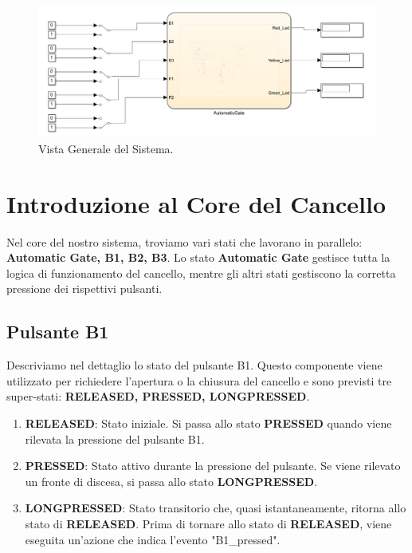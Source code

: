 \documentclass[12pt]{article}
\begin{document}
\begin{figure}[H]
    \centering
    \includegraphics[width=1\textwidth]{Immagini_State_Flow/Vista_Generale.jpg}
    \caption{Vista Generale del Sistema.}
\end{figure}

\section{Introduzione al Core del Cancello}

Nel core del nostro sistema, troviamo vari stati che lavorano in parallelo: \textbf{Automatic Gate, B1, B2, B3}. Lo stato \textbf{Automatic Gate} gestisce tutta la logica di funzionamento del cancello, mentre gli altri stati gestiscono la corretta pressione dei rispettivi pulsanti.

\subsection{Pulsante B1}

Descriviamo nel dettaglio lo stato del pulsante B1. Questo componente viene utilizzato per richiedere l'apertura o la chiusura del cancello e sono previsti tre super-stati: \textbf{RELEASED, PRESSED, LONGPRESSED}.

\begin{enumerate}
    \item \textbf{RELEASED}: Stato iniziale. Si passa allo stato \textbf{PRESSED} quando viene rilevata la pressione del pulsante B1.
    \item \textbf{PRESSED}: Stato attivo durante la pressione del pulsante. Se viene rilevato un fronte di discesa, si passa allo stato \textbf{LONGPRESSED}.
    \item \textbf{LONGPRESSED}: Stato transitorio che, quasi istantaneamente, ritorna allo stato di \textbf{RELEASED}. Prima di tornare allo stato di \textbf{RELEASED}, viene eseguita un'azione che indica l'evento "B1\_pressed".
\end{enumerate}
\end{document}
